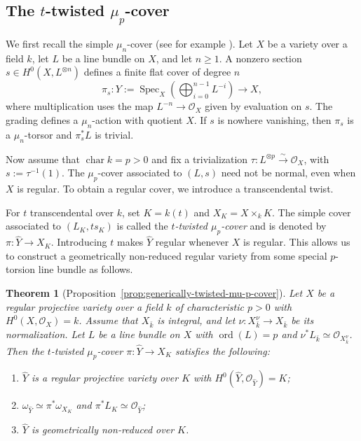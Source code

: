 \documentclass[10pt,abstract=true]{scrartcl}
\numberwithin{equation}{section}
\newtheorem{theorem}{Theorem}[section]
\theoremstyle{definition}
\theoremstyle{remark}
\DeclareMathOperator\ord{ord}
\begin{document}
\subsection*{The \texorpdfstring{$t$}{t}-twisted \texorpdfstring{$\mu_p$}{mu-p}-cover}
We first recall the simple $\mu_n$-cover (see for example \cite[\S0.2]{Cossec-Dolgachev-Liedtke-2025}).
Let $X$ be a variety over a field $k$, let $L$ be a line bundle on $X$, and let $n\ge1$.
A nonzero section $s\in H^0(X,L^{\otimes n})$ defines a finite flat cover of degree $n$
\[
  \pi_s\colon Y:=\operatorname{Spec}_X\!\left(\bigoplus_{i=0}^{n-1}L^{-i}\right)\longrightarrow X,
\]
where multiplication uses the map $L^{-n}\to\mathcal O_X$ given by evaluation on $s$.
The grading defines a $\mu_n$-action with quotient $X$.
If $s$ is nowhere vanishing, then $\pi_s$ is a $\mu_n$-torsor and $\pi_s^*L$ is trivial.

Now assume that $\operatorname{char}k=p>0$ and fix a trivialization $\tau\colon L^{\otimes p}\xrightarrow{\sim}\mathcal O_X$, with $s:=\tau^{-1}(1)$.
The $\mu_p$-cover associated to $(L,s)$ need not be normal, even when $X$ is regular.
To obtain a regular cover, we introduce a transcendental twist.

For $t$ transcendental over $k$, set $K=k(t)$ and $X_K=X\times_kK$.
The simple cover associated to $(L_K,ts_K)$ is called the \emph{$t$-twisted $\mu_p$-cover} and is denoted by $\pi\colon\widehat Y\to X_K$.
Introducing $t$ makes $\widehat Y$ regular whenever $X$ is regular.
This allows us to construct a geometrically non-reduced regular variety from some special $p$-torsion line bundle as follows.
\begin{theorem}[{Proposition~\ref{prop:generically-twisted-mu-p-cover}}]\label{thm:twisted-cover-intro}
  Let $X$ be a regular projective variety over a field $k$ of characteristic $p>0$ with $H^0(X,\mathcal O_X) = k$.
  Assume that $X_{\bar k}$ is integral, and let $\nu\colon X_{\bar k}^\nu\to X_{\bar k}$ be its normalization.
  Let $L$ be a line bundle on $X$ with $\ord(L) = p$ and $\nu^*L_{\bar k}\simeq\mathcal O_{X_{\bar k}^\nu}$.
  Then the $t$-twisted $\mu_p$-cover $\pi\colon\widehat Y\to X_K$ satisfies the following:
  \begin{enumerate}[label=\textup{(\arabic*)}]
    \item $\widehat Y$ is a regular projective variety over $K$ with $H^0(\widehat Y,\mathcal O_{\widehat Y}) = K$;
    \item $\omega_{\widehat Y}\simeq\pi^*\omega_{X_K}$ and $\pi^*L_K\simeq\mathcal O_{\widehat Y}$;
    \item $\widehat Y$ is geometrically non-reduced over $K$.
  \end{enumerate}
\end{theorem}
\end{document}
